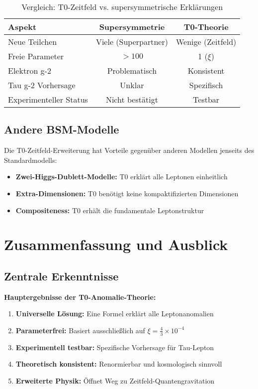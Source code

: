 \documentclass[12pt,a4paper]{article}
\newcommand{\xipar}{\xi}
\begin{document}
	\begin{table}[h]
		\centering
		\begin{tabular}{lcc}
			\toprule
			\textbf{Aspekt} & \textbf{Supersymmetrie} & \textbf{T0-Theorie} \\
			\midrule
			Neue Teilchen & Viele (Superpartner) & Wenige (Zeitfeld) \\
			Freie Parameter & $>100$ & 1 ($\xipar$) \\
			Elektron g-2 & Problematisch & Konsistent \\
			Tau g-2 Vorhersage & Unklar & Spezifisch \\
			Experimenteller Status & Nicht bestätigt & Testbar \\
			\bottomrule
		\end{tabular}
		\caption{Vergleich: T0-Zeitfeld vs. supersymmetrische Erklärungen}
	\end{table}
	
	\subsection{Andere BSM-Modelle}
	
	Die T0-Zeitfeld-Erweiterung hat Vorteile gegenüber anderen Modellen jenseits des Standardmodells:
	
	\begin{itemize}
		\item \textbf{Zwei-Higgs-Dublett-Modelle:} T0 erklärt alle Leptonen einheitlich
		\item \textbf{Extra-Dimensionen:} T0 benötigt keine kompaktifizierten Dimensionen
		\item \textbf{Compositeness:} T0 erhält die fundamentale Leptonstruktur
	\end{itemize}
	
	\section{Zusammenfassung und Ausblick}
	
	\subsection{Zentrale Erkenntnisse}
	
	\begin{keyresult}
		\textbf{Hauptergebnisse der T0-Anomalie-Theorie:}
		
		\begin{enumerate}
			\item \textbf{Universelle Lösung:} Eine Formel erklärt alle Leptonanomalien
			\item \textbf{Parameterfrei:} Basiert ausschließlich auf $\xipar = \frac{4}{3} \times 10^{-4}$
			\item \textbf{Experimentell testbar:} Spezifische Vorhersage für Tau-Lepton
			\item \textbf{Theoretisch konsistent:} Renormierbar und kosmologisch sinnvoll
			\item \textbf{Erweiterte Physik:} Öffnet Weg zu Zeitfeld-Quantengravitation
		\end{enumerate}
	\end{keyresult}
	
\end{document}
